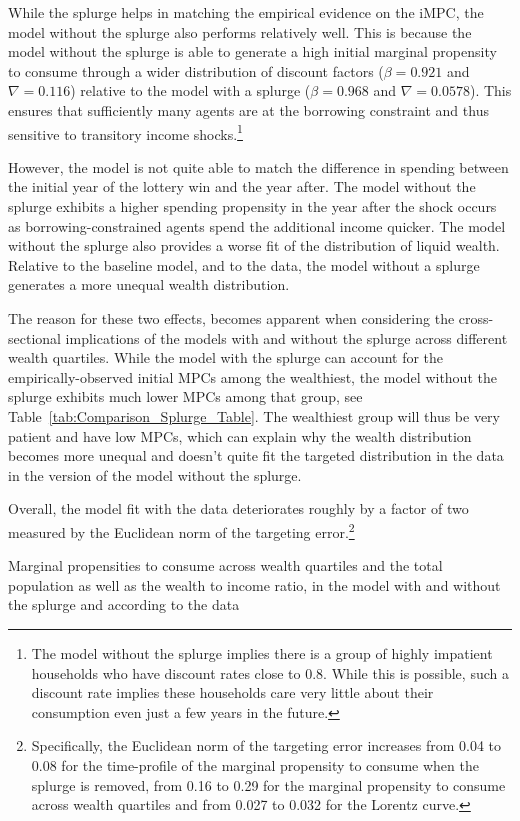 \documentclass[\econtexRoot/HAFiscal-online-appendix]{subfiles}
\begin{document}
While the splurge helps in matching the empirical evidence on the iMPC, the model without the splurge also performs relatively well. This is because the model without the splurge is able to generate a high initial marginal propensity to consume through a wider distribution of discount factors ($\beta = 0.921$ and $\nabla=0.116$) relative to the model with a splurge ($\beta = 0.968$ and $\nabla=0.0578$). This ensures that sufficiently many agents are at the borrowing constraint and thus sensitive to transitory income shocks.\footnote{The model without the splurge implies there is a group of highly impatient households who have discount rates close to 0.8. While this is possible, such a discount rate implies these households care very little about their consumption even just a few years in the future.}

However, the model is not quite able to match the difference in spending between the initial year of the lottery win and the year after.
The model without the splurge exhibits a higher spending propensity in the year after the shock occurs as borrowing-constrained agents spend the additional income quicker.
The model without the splurge also provides a worse fit of the distribution of liquid wealth.
Relative to the baseline model, and to the data, the model without a splurge generates a more unequal wealth distribution.


The reason for these two effects, becomes apparent when considering the cross-sectional implications of the models with and without the splurge across different wealth quartiles.
While the model with the splurge can account for the empirically-observed initial MPCs among the wealthiest, the model without the splurge exhibits much lower MPCs among that group, see Table~\ref{tab:Comparison_Splurge_Table}. The wealthiest group will thus be very patient and have low MPCs, which can explain why the wealth distribution becomes more unequal and doesn't quite fit the targeted distribution in the data in the version of the model without the splurge.


Overall, the model fit with the data deteriorates roughly by a factor of two measured by the Euclidean norm of the targeting error.\footnote{Specifically, the Euclidean norm of the targeting error increases from 0.04 to 0.08 for the time-profile of the marginal propensity to consume when the splurge is removed, from 0.16 to 0.29 for the marginal propensity to consume across wealth quartiles and from 0.027 to 0.032 for the Lorentz curve.} 

\begin{table}[t]
	\center
	
	\caption{Marginal propensities to consume across wealth quartiles and the total population as well as the wealth to income ratio, in the model with and without the splurge and according to the data}
	\notinsubfile{\label{tab:Comparison_Splurge_Table}}
\end{table}
\end{document}
